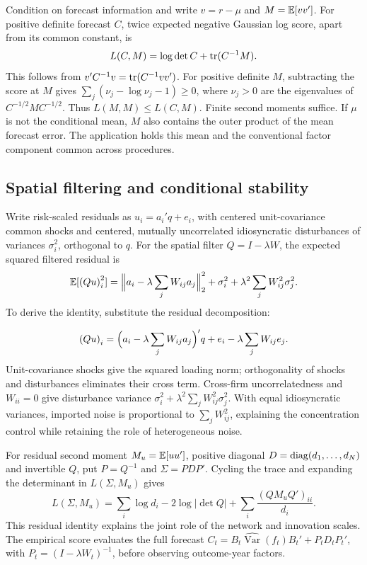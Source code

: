 \documentclass[11pt]{article}
\renewcommand{\lean}[1]{\ignorespaces}
\renewcommand{\leanok}{\ignorespaces}
\begin{document}
Condition on forecast information and write $v=r-\mu$ and $M=\mathbb{E}[vv']$.
For positive definite forecast $C$, twice expected negative Gaussian log score,
apart from its common constant, is
\begin{equation}\label{eq:expected-score}
  L(C,M)=\log\det C+\operatorname{tr}(C^{-1}M).
\end{equation}
This follows from $v'C^{-1}v=\operatorname{tr}(C^{-1}vv')$.
For positive definite $M$, subtracting the score at $M$ gives
$\sum_j(\nu_j-\log\nu_j-1)\ge0$, where $\nu_j>0$ are the eigenvalues of
$C^{-1/2}MC^{-1/2}$. Thus $L(M,M)\le L(C,M)$.
\lean{FreeFoundations.Score.expected_loss,
FreeFoundations.Score.loss_le}\leanok{}
Finite second moments suffice. If $\mu$ is not the conditional mean, $M$ also
contains the outer product of the mean forecast error. The application holds
this mean and the conventional factor component common across procedures.

\subsection{Spatial filtering and conditional stability}
Write risk-scaled residuals as $u_i=a_i'q+e_i$, with centered
unit-covariance common shocks and centered, mutually uncorrelated idiosyncratic
disturbances of variances $\sigma_i^2$, orthogonal to $q$. For the spatial
filter $Q=I-\lambda W$, the expected squared filtered residual is
\begin{equation}\label{eq:filtered}
  \mathbb{E}[{(Qu)}_i^2]
  =\Bigl\lVert a_i-\lambda\sum_j W_{ij}a_j\Bigr\rVert_2^2
  +\sigma_i^2+\lambda^2\sum_j W_{ij}^2\sigma_j^2.
\end{equation}
To derive the identity, substitute the residual decomposition:

\[
  {(Qu)}_i=\Bigl(a_i-\lambda\sum_j W_{ij}a_j\Bigr)'q
  +e_i-\lambda\sum_j W_{ij}e_j.
\]
Unit-covariance shocks give the squared loading norm; orthogonality of shocks
and disturbances eliminates their cross term. Cross-firm uncorrelatedness and
$W_{ii}=0$ give disturbance variance
$\sigma_i^2+\lambda^2\sum_j W_{ij}^2\sigma_j^2$.
\lean{FreeFoundations.Likelihood.filtered_second_moment}\leanok{}
With equal idiosyncratic variances, imported noise is proportional to
$\sum_j W_{ij}^2$, explaining the concentration control while retaining the role
of heterogeneous noise.

For residual second moment $M_u=\mathbb{E}[uu']$, positive diagonal
$D=\operatorname{diag}(d_1,\ldots,d_N)$ and invertible $Q$, put $P=Q^{-1}$ and $\Sigma=PDP'$.
Cycling the trace and expanding the determinant in
$L(\Sigma,M_u)$ gives
\begin{equation}\label{eq:spatial-loss}
  L(\Sigma,M_u)=\sum_i\log d_i-2\log|\det Q|
  +\sum_i\frac{{(Q M_u Q')}_{ii}}{d_i}.
\end{equation}
\lean{FreeFoundations.Likelihood.spatial_loss}\leanok{}
This residual identity explains the joint role of the network and innovation
scales. The empirical score evaluates the full forecast
$C_t=B_t\widehat{\operatorname{Var}}(f_t)B_t'+P_t D_t P_t'$, with
$P_t={(I-\lambda W_t)}^{-1}$, before observing outcome-year factors.
\end{document}
